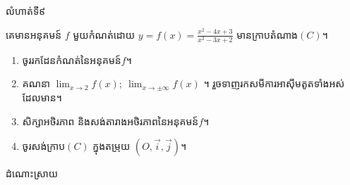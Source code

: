 \documentclass[expologarit]{subfiles}
\begin{document}
 \begin{center}
 \color{violet} \kml លំហាត់ទី៩
 \end{center}
គេមានអនុគមន៍ $f$ មួយកំណត់ដោយ $y=f(x)=\frac{x^2-4x+3}{x^2-3x+2}$ មានក្រាបតំណាង$(C)$។
\begin{enumerate}[k]
\item ចូររកដែនកំណត់នៃអនុគមន៍$f$។
\item គណនា $\lim_{x\to 2}f(x);\ \lim_{x\to \pm\infty}f(x)$ ។ រួចទាញរកសមីការអាស៊ីមតូតទាំងអស់ដែលមាន។
\item សិក្សាអថិរភាព និងសង់តារាងអថិរភាពនៃអនុគមន៍$f$។
\item ចូរសង់ក្រាប$(C)$ ក្នុងតម្រុយ $\left(O,\overrightarrow{i},\overrightarrow{j}\right)$។
\end{enumerate}
\begin{center}
\color{violet} \kml ដំណោះស្រាយ
\end{center}
\end{document}
